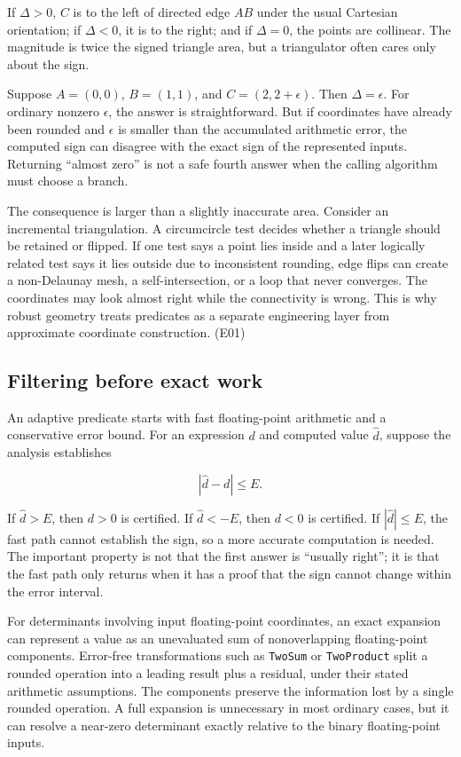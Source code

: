 If \(\Delta>0\), \(C\) is to the left of directed edge \(AB\) under the usual Cartesian orientation; if \(\Delta<0\), it is to the right; and if \(\Delta=0\), the points are collinear. The magnitude is twice the signed triangle area, but a triangulator often cares only about the sign.

Suppose \(A=(0,0)\), \(B=(1,1)\), and \(C=(2,2+\epsilon)\). Then \(\Delta=\epsilon\). For ordinary nonzero \(\epsilon\), the answer is straightforward. But if coordinates have already been rounded and \(\epsilon\) is smaller than the accumulated arithmetic error, the computed sign can disagree with the exact sign of the represented inputs. Returning ``almost zero'' is not a safe fourth answer when the calling algorithm must choose a branch.

The consequence is larger than a slightly inaccurate area. Consider an incremental triangulation. A circumcircle test decides whether a triangle should be retained or flipped. If one test says a point lies inside and a later logically related test says it lies outside due to inconsistent rounding, edge flips can create a non-Delaunay mesh, a self-intersection, or a loop that never converges. The coordinates may look almost right while the connectivity is wrong. This is why robust geometry treats predicates as a separate engineering layer from approximate coordinate construction. (E01)

\subsection{Filtering before exact work}\label{02-foundations-ii-ch034-filtering-before-exact-work}

\hypertarget{02-foundations-ii-ch034-filtering-before-exact-work}{}

An adaptive predicate starts with fast floating-point arithmetic and a conservative error bound. For an expression \(d\) and computed value \(\widehat d\), suppose the analysis establishes

\[
|\widehat d-d|\le E.
\]

If \(\widehat d>E\), then \(d>0\) is certified. If \(\widehat d<-E\), then \(d<0\) is certified. If \(|\widehat d|\le E\), the fast path cannot establish the sign, so a more accurate computation is needed. The important property is not that the first answer is ``usually right''; it is that the fast path only returns when it has a proof that the sign cannot change within the error interval.

For determinants involving input floating-point coordinates, an exact expansion can represent a value as an unevaluated sum of nonoverlapping floating-point components. Error-free transformations such as \texttt{TwoSum} or \texttt{TwoProduct} split a rounded operation into a leading result plus a residual, under their stated arithmetic assumptions. The components preserve the information lost by a single rounded operation. A full expansion is unnecessary in most ordinary cases, but it can resolve a near-zero determinant exactly relative to the binary floating-point inputs.


